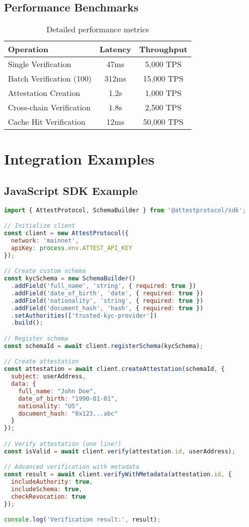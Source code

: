 \documentclass[11pt,a4paper]{article}
\begin{document}
\subsection{Performance Benchmarks}

\begin{table}[H]
\centering
\caption{Detailed performance metrics}
\begin{tabular}{@{}lcc@{}}
\toprule
\textbf{Operation} & \textbf{Latency} & \textbf{Throughput} \\
\midrule
Single Verification & 47ms & 5,000 TPS \\
Batch Verification (100) & 312ms & 15,000 TPS \\
Attestation Creation & 1.2s & 1,000 TPS \\
Cross-chain Verification & 1.8s & 2,500 TPS \\
Cache Hit Verification & 12ms & 50,000 TPS \\
\bottomrule
\end{tabular}
\end{table}

\section{Integration Examples}\label{app:integration}

\subsection{JavaScript SDK Example}

\begin{lstlisting}[language=JavaScript, caption={Complete JavaScript integration example}]
import { AttestProtocol, SchemaBuilder } from '@attestprotocol/sdk';

// Initialize client
const client = new AttestProtocol({
  network: 'mainnet',
  apiKey: process.env.ATTEST_API_KEY
});

// Create custom schema
const kycSchema = new SchemaBuilder()
  .addField('full_name', 'string', { required: true })
  .addField('date_of_birth', 'date', { required: true })
  .addField('nationality', 'string', { required: true })
  .addField('document_hash', 'hash', { required: true })
  .setAuthorities(['trusted-kyc-provider'])
  .build();

// Register schema
const schemaId = await client.registerSchema(kycSchema);

// Create attestation
const attestation = await client.createAttestation(schemaId, {
  subject: userAddress,
  data: {
    full_name: "John Doe",
    date_of_birth: "1990-01-01",
    nationality: "US",
    document_hash: "0x123...abc"
  }
});

// Verify attestation (one line!)
const isValid = await client.verify(attestation.id, userAddress);

// Advanced verification with metadata
const result = await client.verifyWithMetadata(attestation.id, {
  includeAuthority: true,
  includeSchema: true,
  checkRevocation: true
});

console.log('Verification result:', result);
\end{lstlisting}
\end{document}
